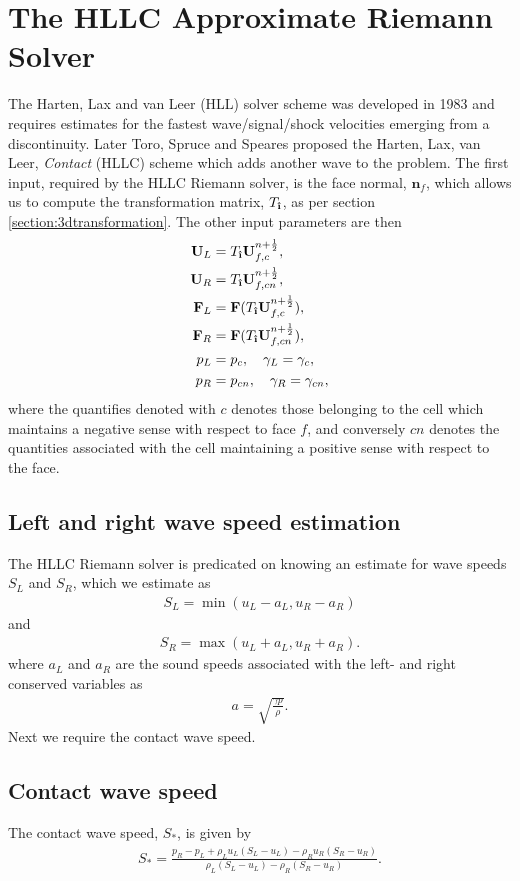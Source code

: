 \documentclass[10pt,letterpaper,notitlepage]{article}
\numberwithin{equation}{section}
\newcommand{\uvec}[1]{\boldsymbol{\hat{\textbf{#1}}}}
\newcommand{\ihat}{\uvec{\i}}
\newcommand{\beqn}{\begin{equation}\begin{aligned}}
\newcommand{\eeqn}{\end{aligned}\end{equation}}
\begin{document}
\section{The HLLC Approximate Riemann Solver} \label{section:HLLC}
The Harten, Lax and van Leer (HLL) solver scheme was developed in 1983 \cite{Toro} and requires estimates for the fastest wave/signal/shock velocities emerging from a discontinuity. Later Toro, Spruce and Speares proposed the Harten, Lax, van Leer, \textit{Contact} (HLLC) scheme \cite{Toro} which adds another wave to the problem.
\newline
\newline
The first input, required by the HLLC Riemann solver, is the face normal, $\mathbf{n}_f$, which allows us to compute the transformation matrix, $T_{\ihat}$, as per section \ref{section:3dtransformation}. The other input parameters are then
\beqn 
\mathbf{U}_L &= T_{\ihat} \mathbf{U}_{f,c}^{n{+}\frac{1}{2}}, \\
\mathbf{U}_R &= T_{\ihat} \mathbf{U}_{f,cn}^{n{+}\frac{1}{2}}, \\
\mathbf{F}_L &= \mathbf{F}(T_{\ihat} \mathbf{U}_{f,c}^{n{+}\frac{1}{2}}), \\
\mathbf{F}_R &= \mathbf{F}(T_{\ihat} \mathbf{U}_{f,cn}^{n{+}\frac{1}{2}}), \\
p_L &= p_c, \quad \gamma_L = \gamma_c,\\
p_R &= p_{cn}, \quad \gamma_R = \gamma_{cn},
\eeqn 
where the quantifies denoted with $c$ denotes those belonging to the cell which maintains a negative sense with respect to face $f$, and conversely $cn$ denotes the quantities associated with the cell maintaining a positive sense with respect to the face.


\subsection{Left and right wave speed estimation}
The HLLC Riemann solver is predicated on knowing an estimate for wave speeds $S_L$ and $S_R$, which we estimate as
\beqn 
S_L = \min(u_L-a_L, u_R-a_R)
\eeqn 
and
\beqn 
S_R = \max(u_L+a_L,u_R+a_R).
\eeqn 
where $a_L$ and $a_R$ are the sound speeds associated with the left- and right conserved variables as
\beqn 
a = \sqrt{\frac{\gamma p}{\rho}}.
\eeqn 
Next we require the contact wave speed.

\subsection{Contact wave speed}
The contact wave speed, $S_*$, is given by
\beqn 
S_* = \frac{p_R - p_L +\rho_L u_L(S_L-u_L) - \rho_R u_R(S_R-u_R)}
{\rho_L (S_L-u_L) - \rho_R(S_R-u_R)}.
\eeqn 
\end{document}

